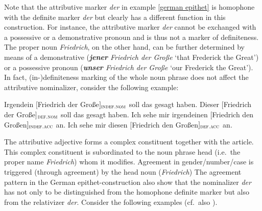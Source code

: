 Note that the attributive marker \textit{der} in example \ref{german epithet} is homophone with the definite marker \textit{der} but clearly has a different function in this construction. For instance, the attributive marker \textit{der} cannot be exchanged with a possessive or a demonstrative pronoun and is thus not a marker of definiteness. The proper noun \textit{Friedrich}, on the other hand, can be further determined by means of a demonstrative (\textit{\textbf{jener} Friedrich der Große} ‘that Frederick the Great’) or a possessive pronoun (\textit{\textbf{unser} Friedrich der Große} ‘our Frederick the Great’). In fact, (in-)definiteness marking of the whole noun phrase does not affect the attributive nominalizer, consider the following example:
\begin{exe}
\ex
{}
\begin{xlist}
\ex	Irgendein $[$Friedrich der Große$]_{\textsc{indef.nom}}$ soll das gesagt haben.
\ex	Dieser $[$Friedrich der Große$]$$_{\textsc{def.nom}}$ soll das gesagt haben. 
\ex	Ich sehe mir irgendeinen $[$Friedrich den Großen$]_{\textsc{indef.acc}}$ an.
\ex	Ich sehe mir diesen $[$Friedrich den Großen$]_{\textsc{def.acc}}$ an.
\end{xlist}
\end{exe}
The attributive adjective forms a complex constituent together with the article. This complex constituent is subordinated to the noun phrase head (i.e.~the proper name \textit{Friedrich}) whom it modifies. Agreement in gender\fshyp{}number\fshyp{}case is triggered (through agreement) by the head noun (\textit{Friedrich})%
The agreement pattern in the German epithet-construction also show that the nominalizer \textit{der} has not only to be distinguished from the homophone definite marker but also from the relativizer \textit{der}. Consider the following examples (cf.~also \citealt[181]{himmelmann1997}).
\ea \label{article versus rel}
\z
\z
